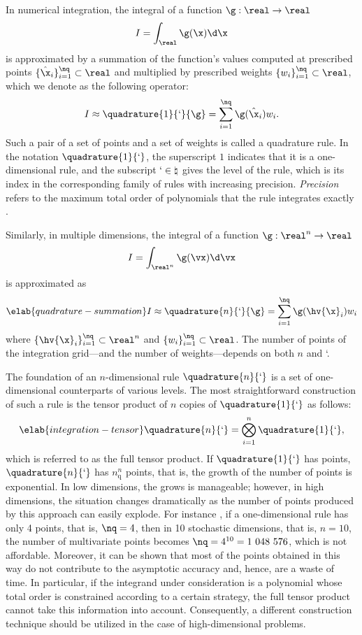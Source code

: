 In numerical integration, the integral of a function $\g: \real \to \real$
\[
  I = \int_\real \g(\x) \d \x
\]
is approximated by a summation of the function's values computed at prescribed
points $\{ \hat{\x}_i \}_{i = 1}^\nq \subset \real$ and multiplied by prescribed
weights $\{ w_i \}_{i = 1}^\nq \subset \real$, which we denote as the following
operator:
\[
  I \approx \quadrature{1}{\lq}{\g} = \sum_{i = 1}^\nq \g(\hat{\x}_i) w_i.
\]
Such a pair of a set of points and a set of weights is called a quadrature rule.
In the notation $\quadrature{1}{\lq}$, the superscript $1$ indicates that it is
a one-dimensional rule, and the subscript $\lq \in \natural$ gives the level of
the rule, which is its index in the corresponding family of rules with
increasing precision. \emph{Precision} refers to the maximum total order of
polynomials that the rule integrates exactly \cite{heiss2008}.

Similarly, in multiple dimensions, the integral of a function $\g: \real^n \to
\real$
\[
  I = \int_{\real^n} \g(\vx) \d \vx
\]
is approximated as
\begin{equation} \elab{quadrature-summation}
  I \approx \quadrature{n}{\lq}{\g} = \sum_{i = 1}^\nq \g(\hv{\x}_i) w_i
\end{equation}
where $\{ \hv{\x}_i \}_{i = 1}^\nq \subset \real^n$ and $\{ w_i \}_{i = 1}^\nq
\subset \real$. The number of points \nq of the integration grid---and the
number of weights---depends on both $n$ and \lq.

The foundation of an $n$-dimensional rule $\quadrature{n}{\lq}$ is a set of
one-dimensional counterparts of various levels. The most straightforward
construction of such a rule is the tensor product of $n$ copies of
$\quadrature{1}{\lq}$ as follows:
\begin{equation} \elab{integration-tensor}
  \quadrature{n}{\lq} = \bigotimes_{i = 1}^n \quadrature{1}{\lq},
\end{equation}
which is referred to as the full tensor product. If $\quadrature{1}{\lq}$ has
\nq points, $\quadrature{n}{\lq}$ has $n_\mathrm{q}^n$ points, that is, the
growth of the number of points is exponential. In low dimensions, the grows is
manageable; however, in high dimensions, the situation changes dramatically as
the number of points produced by this approach can easily explode. For instance
\cite{heiss2008}, if a one-dimensional rule has only 4 points, that is, $\nq =
4$, then in 10 stochastic dimensions, that is, $n = 10$, the number of
multivariate points becomes $\nq = 4^{10} = 1~048~576$, which is not affordable.
Moreover, it can be shown that most of the points obtained in this way do not
contribute to the asymptotic accuracy and, hence, are a waste of time. In
particular, if the integrand under consideration is a polynomial whose total
order is constrained according to a certain strategy, the full tensor product
cannot take this information into account. Consequently, a different
construction technique should be utilized in the case of high-dimensional
problems.

